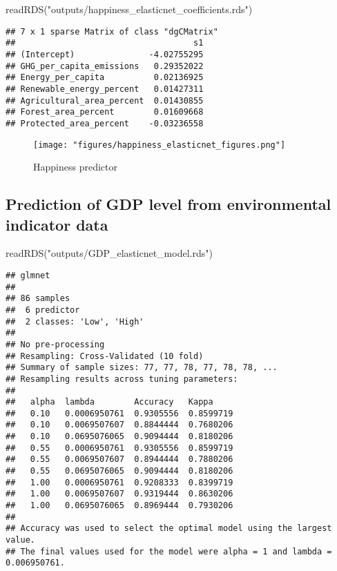 \documentclass[
]{article}
\newenvironment{Shaded}{\begin{snugshade}}{\end{snugshade}}
\newcommand{\FunctionTok}[1]{\textcolor[rgb]{0.00,0.00,0.00}{#1}}
\newcommand{\NormalTok}[1]{#1}
\newcommand{\StringTok}[1]{\textcolor[rgb]{0.31,0.60,0.02}{#1}}
\begin{document}
\begin{Shaded}
\begin{Highlighting}[]
\FunctionTok{readRDS}\NormalTok{(}\StringTok{"outputs/happiness\_elasticnet\_coefficients.rds"}\NormalTok{)}
\end{Highlighting}
\end{Shaded}

\begin{verbatim}
## 7 x 1 sparse Matrix of class "dgCMatrix"
##                                    s1
## (Intercept)               -4.02755295
## GHG_per_capita_emissions   0.29352022
## Energy_per_capita          0.02136925
## Renewable_energy_percent   0.01427311
## Agricultural_area_percent  0.01430855
## Forest_area_percent        0.01609668
## Protected_area_percent    -0.03236558
\end{verbatim}

\begin{figure}
\centering
\texttt{[image: "figures/happiness\_elasticnet\_figures.png"]}
\caption{Happiness predictor}
\end{figure}

\hypertarget{prediction-of-gdp-level-from-environmental-indicator-data}{%
\subsection{Prediction of GDP level from environmental indicator
data}\label{prediction-of-gdp-level-from-environmental-indicator-data}}

\begin{Shaded}
\begin{Highlighting}[]
\FunctionTok{readRDS}\NormalTok{(}\StringTok{"outputs/GDP\_elasticnet\_model.rds"}\NormalTok{)}
\end{Highlighting}
\end{Shaded}

\begin{verbatim}
## glmnet 
## 
## 86 samples
##  6 predictor
##  2 classes: 'Low', 'High' 
## 
## No pre-processing
## Resampling: Cross-Validated (10 fold) 
## Summary of sample sizes: 77, 77, 78, 77, 78, 78, ... 
## Resampling results across tuning parameters:
## 
##   alpha  lambda        Accuracy   Kappa    
##   0.10   0.0006950761  0.9305556  0.8599719
##   0.10   0.0069507607  0.8844444  0.7680206
##   0.10   0.0695076065  0.9094444  0.8180206
##   0.55   0.0006950761  0.9305556  0.8599719
##   0.55   0.0069507607  0.8944444  0.7880206
##   0.55   0.0695076065  0.9094444  0.8180206
##   1.00   0.0006950761  0.9208333  0.8399719
##   1.00   0.0069507607  0.9319444  0.8630206
##   1.00   0.0695076065  0.8969444  0.7930206
## 
## Accuracy was used to select the optimal model using the largest value.
## The final values used for the model were alpha = 1 and lambda = 0.006950761.
\end{verbatim}
\end{document}
